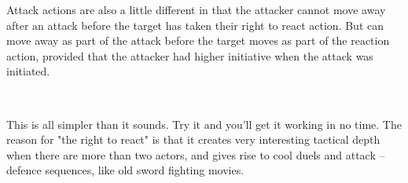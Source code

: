 Attack actions are also a little different in that the attacker cannot move away after an attack before the target has taken their right to react action. But can move away as part of the attack before the target moves as part of the reaction action, provided that the attacker had higher initiative when the attack was initiated.


\

This is all simpler than it sounds. Try it and you'll get it working in no time. The reason for "the right to react" is that it creates very interesting tactical depth when there are more than two actors, and gives rise to cool duels and attack -- defence sequences, like old sword fighting movies.


